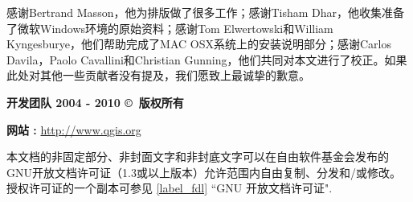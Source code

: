 感谢Bertrand Masson，他为排版做了很多工作；感谢Tisham Dhar，他收集准备了微软Windows环境的原始资料；感谢Tom Elwertowski和William Kyngesburye，他们帮助完成了MAC OSX系统上的安装说明部分；感谢Carlos Davila，Paolo
Cavallini和Christian Gunning，他们共同对本文进行了校正。如果此处对其他一些贡献者没有提及，我们愿致上最诚挚的歉意。
\par\bigskip\noindent
\textbf{\QG 开发团队 2004 - 2010 \copyright~版权所有}
\par\bigskip\noindent
\textbf{网站 :} \url{http://www.qgis.org}


本文档的非固定部分、非封面文字和非封底文字可以在自由软件基金会发布的GNU开放文档许可证（1.3或以上版本）允许范围内自由复制、分发和/或修改。授权许可证的一个副本可参见 \ref{label_fdl} “GNU 开放文档许可证".

\newpage
